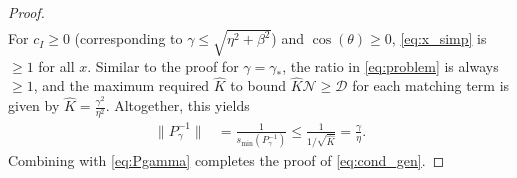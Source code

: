 \documentclass[a4paper,10pt]{article}
\begin{document}
\begin{proof}
\begin{align}
\end{align}
%
For $c_I\geq 0$ (corresponding to $\gamma \leq\sqrt{\eta^2+\beta^2}$)
and $\cos(\theta)\geq 0$, \eqref{eq:x_simp} is $\geq 1$ for all $x$.
%
Similar to the proof for $\gamma = \gamma_*$, the ratio in \eqref{eq:problem}
is always $\geq 1$, and the maximum required $\widehat{K}$ to bound
$\widehat{K}\mathcal{N} \geq \mathcal{D}$ for each matching term is
given by $\widehat{K} = \tfrac{\gamma^2}{\eta^2}$. Altogether,
this yields
%
\begin{align*}
\|P_{\gamma}^{-1}\| & = \frac{1}{s_{\min}(P_{\gamma}^{-1})} 
	\leq \frac{1}{1/\sqrt{\widehat{K}}} 
	= \frac{\gamma}{\eta}.
\end{align*}
%
Combining with \eqref{eq:Pgamma} completes the proof of \eqref{eq:cond_gen}.
\end{proof}
%


\end{document}
